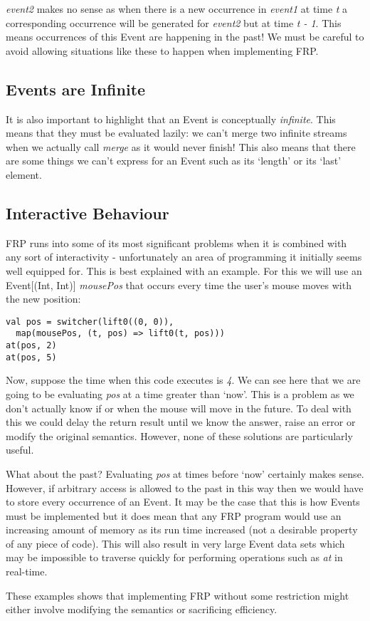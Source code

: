       \emph{event2} makes no sense as when there is a new occurrence in \emph{event1} at time 
      \emph{t} a corresponding occurrence will be generated for \emph{event2} but at time 
      \emph{t - 1}. This means occurrences of this Event are happening in the past! We must
      be careful to avoid allowing situations like these to happen when implementing FRP.
      
    \subsection{Events are Infinite}  
      It is also important to highlight that an Event is conceptually \emph{infinite}. This means
      that they must be evaluated lazily: we can't merge two infinite streams when we actually
      call \emph{merge} as it would never finish! This also means that there are some things we
      can't express for an Event such as its `length' or its `last' element.
    
    \subsection{Interactive Behaviour}
      FRP runs into some of its most significant problems when it is combined with any
      sort of interactivity - unfortunately an area of programming it initially seems
      well equipped for. This is best explained with an example. For this we will use an 
      Event[(Int, Int)] \emph{mousePos} that occurs every time the user's mouse moves with the new position:

\begin{verbatim}
val pos = switcher(lift0((0, 0)), 
  map(mousePos, (t, pos) => lift0(t, pos)))
at(pos, 2)
at(pos, 5)
\end{verbatim}    

      Now, suppose the time when this code executes is \emph{4}. We can see here
      that we are going to be evaluating \emph{pos} at a time greater than `now'. This is a problem as we don't
      actually know if or when the mouse will move in the future. To deal with this we could delay the return
      result until we know the answer, raise an error or modify the original semantics. However, none of these solutions are
      particularly useful.
      
      What about the past? Evaluating \emph{pos} at times before `now' certainly makes sense. However, if arbitrary
      access is allowed to the past in this way then we would have to store every occurrence
      of an Event. It may be the case that this is how Events must be implemented but it does
      mean that any FRP program would use an increasing amount of memory as its run time increased (not a 
      desirable property of any piece of code). This will also result in very large Event data sets which
      may be impossible to traverse quickly for performing operations such as \emph{at} in real-time.
      
      These examples shows that implementing FRP without some restriction might either involve modifying the
      semantics or sacrificing efficiency.